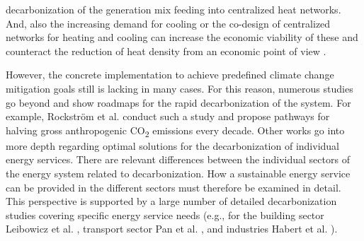 decarbonization of the generation mix feeding into centralized heat networks. And, also the increasing demand for cooling or the co-design of centralized networks for heating and cooling can increase the economic viability of these and counteract the reduction of heat density from an economic point of view \cite{zhang2021economic}.\vspace{0.3cm}

However, the concrete implementation to achieve predefined climate change mitigation goals still is lacking in many cases. For this reason, numerous studies go beyond and show roadmaps for the rapid decarbonization of the system. For example, Rockstr{\"o}m et al. \cite{rockstrom2017roadmap} conduct such a study and propose pathways for halving gross anthropogenic CO\textsubscript{2} emissions every decade. Other works go into more depth regarding optimal solutions for the decarbonization of individual energy services. There are relevant differences between the individual sectors of the energy system related to decarbonization. How a sustainable energy service can be provided in the different sectors must therefore be examined in detail. This perspective is supported by a large number of detailed decarbonization studies covering specific energy service needs (e.g., for the building sector Leibowicz et al. \cite{leibowicz2018optimal}, transport sector Pan et al. \cite{pan2018decarbonization}, and industries Habert et al. \cite{habert2020environmental}).\vspace{0.3cm}

